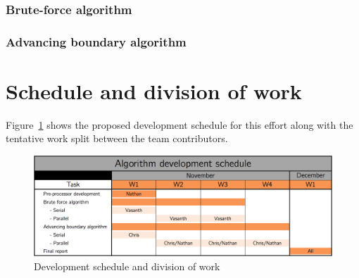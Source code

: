\documentclass[]{aiaa-tc}%
\begin{document}
\subsubsection{Brute-force algorithm}




\subsubsection{Advancing boundary algorithm}



\section{Schedule and division of work}
Figure~\ref{f:schedule} shows the proposed development schedule for
this effort along with the tentative work split between the team contributors.

\begin{figure}
  \centering
  \includegraphics[width=0.9\linewidth]{figures/schedule}
  \caption{Development schedule and division of work}
  \label{f:schedule}
\end{figure}

%
%
\end{document}
